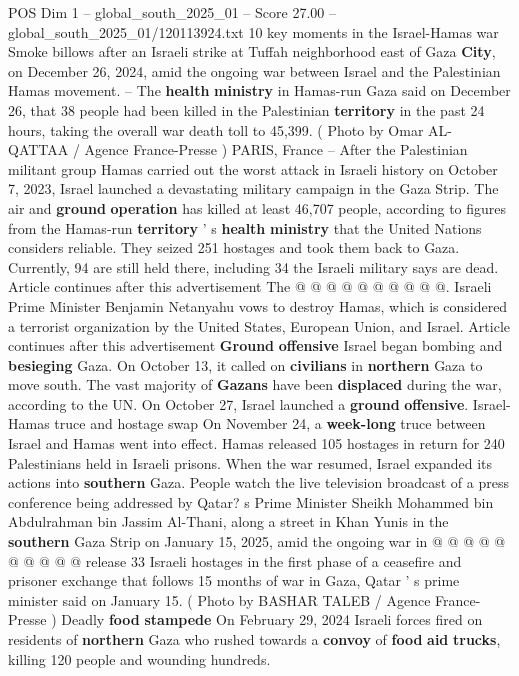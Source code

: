 \begin{textsample}{POS Dim 1 – global\_south\_2025\_01 – Score 27.00 – global\_south\_2025\_01/120113924.txt}  \label{ex:f1_pos_299}
10 key moments in the Israel-Hamas war Smoke billows after an Israeli strike at Tuffah neighborhood east of Gaza \textbf{City}, on December 26, 2024, amid the ongoing war between Israel and the Palestinian Hamas movement. -- The \textbf{health} \textbf{ministry} in Hamas-run Gaza said on December 26, that 38 people had been killed in the Palestinian \textbf{territory} in the past 24 hours, taking the overall war death toll to 45,399. ( Photo by Omar AL-QATTAA / Agence France-Presse ) PARIS, France -- After the Palestinian militant group Hamas carried out the worst attack in Israeli history on October 7, 2023, Israel launched a devastating military campaign in the Gaza Strip.
The air and \textbf{ground} \textbf{operation} has killed at least 46,707 people, according to figures from the Hamas-run \textbf{territory} ' s \textbf{health} \textbf{ministry} that the United Nations considers reliable.
They seized 251 hostages and took them back to Gaza.
Currently, 94 are still held there, including 34 the Israeli military says are dead.
Article continues after this advertisement The @ @ @ @ @ @ @ @ @ @.
Israeli Prime Minister Benjamin Netanyahu vows to destroy Hamas, which is considered a terrorist organization by the United States, European Union, and Israel.
Article continues after this advertisement \textbf{Ground} \textbf{offensive} Israel began bombing and \textbf{besieging} Gaza.
On October 13, it called on \textbf{civilians} in \textbf{northern} Gaza to move south.
The vast majority of \textbf{Gazans} have been \textbf{displaced} during the war, according to the UN.
On October 27, Israel launched a \textbf{ground} \textbf{offensive}.
Israel-Hamas truce and hostage swap On November 24, a \textbf{week-long} truce between Israel and Hamas went into effect.
Hamas released 105 hostages in return for 240 Palestinians held in Israeli prisons.
When the war resumed, Israel expanded its actions into \textbf{southern} Gaza.
People watch the live television broadcast of a press conference being addressed by Qatar? s Prime Minister Sheikh Mohammed bin Abdulrahman bin Jassim Al-Thani, along a street in Khan Yunis in the \textbf{southern} Gaza Strip on January 15, 2025, amid the ongoing war in @ @ @ @ @ @ @ @ @ @ release 33 Israeli hostages in the first phase of a ceasefire and prisoner exchange that follows 15 months of war in Gaza, Qatar ' s prime minister said on January 15. ( Photo by BASHAR TALEB / Agence France-Presse ) Deadly \textbf{food} \textbf{stampede} On February 29, 2024 Israeli forces fired on residents of \textbf{northern} Gaza who rushed towards a \textbf{convoy} of \textbf{food} \textbf{aid} \textbf{trucks}, killing 120 people and wounding hundreds.

\end{textsample}

